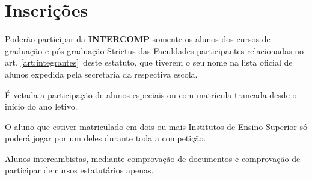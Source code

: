 
{\let\clearpage\relax \chapter{Inscrições}}

\begin{article}
	Poderão participar da \textbf{INTERCOMP} somente os alunos dos cursos de graduação e pós-graduação Strictus das Faculdades participantes relacionadas no art. \ref{art:integrantes}\ulo\ deste estatuto, que tiverem o seu nome na lista oficial de alunos expedida pela secretaria da respectiva escola.

	\begin{xparagraph}
		É vetada a participação de alunos especiais ou com matrícula trancada desde o início do ano letivo.
	\end{xparagraph}

	\begin{xparagraph}
		O aluno que estiver matriculado em dois ou mais Institutos de Ensino Superior só poderá jogar por um deles durante toda a competição.
	\end{xparagraph}

	\begin{xparagraph}
		Alunos intercambistas, mediante comprovação de documentos e comprovação de participar de cursos estatutários apenas.
	\end{xparagraph}
\end{article}

